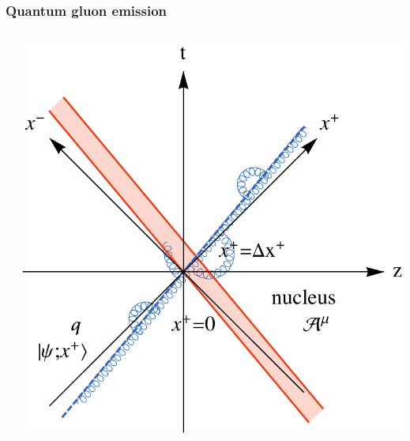 \documentclass[aspectratio=169,11pt,usenames,dvipsnames]{beamer}
\begin{document}
\begin{frame}
    \frametitle{Quantum gluon emission}
    \vspace{-15pt}
    \begin{center}
        \begin{columns}[onlytextwidth,t]
           \begin{center}
                
            \end{center}

            \vspace{-10pt}
            \begin{center}
                \includegraphics[width=0.88\columnwidth]{images/F1_qgA_worldline_mono.pdf}
            \end{center}


\end{columns}
\end{center}
\end{frame}
\end{document}
